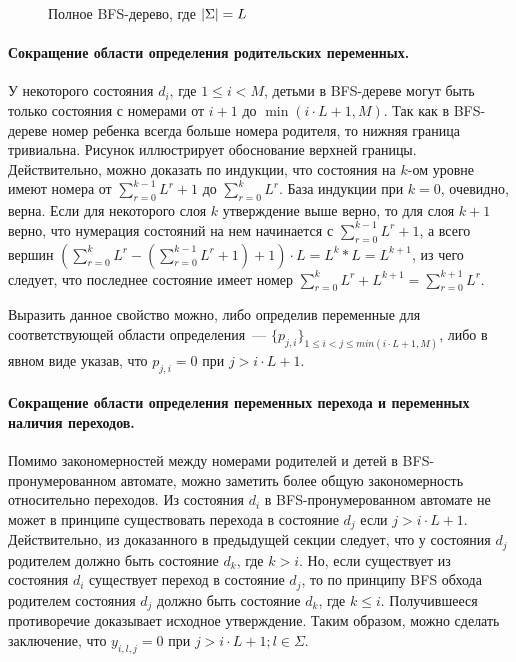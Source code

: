 \begin{figure}[ht]
  \centering
  \scalebox{0.625}{}
  \caption{Полное BFS-дерево, где $\lvert\Sigma\rvert=L$}
  \label{img:full-bfs}
\end{figure}

\paragraph{Сокращение области определения родительских переменных.}
У некоторого состояния $d_{i}$, где $1 \leq i < M$, детьми в BFS-дереве могут быть только состояния с номерами от $i + 1$ до $\min\left(i \cdot L + 1, M\right)$.
Так как в BFS-дереве номер ребенка всегда больше номера родителя, то нижняя граница тривиальна.
Рисунок  иллюстрирует обоснование верхней границы.
Действительно, можно доказать по индукции, что состояния на $k$-ом уровне имеют номера от $\sum_{r = 0}^{k - 1}L^{r} + 1$ до $\sum_{r = 0}^{k}L^{r}$.
База индукции при $k = 0$, очевидно, верна.
Если для некоторого слоя $k$ утверждение выше верно, то для слоя $k + 1$ верно, что нумерация состояний на нем начинается с $\sum_{r = 0}^{k - 1}L^{r} + 1$, а всего вершин $\left(\sum_{r = 0}^{k}L^{r} - \left(\sum_{r = 0}^{k - 1}L^{r} + 1\right) + 1\right) \cdot L = L^{k} * L = L^{k + 1}$, из чего следует, что последнее состояние имеет номер $\sum_{r = 0}^{k}L^{r} + L^{k + 1} = \sum_{r = 0}^{k + 1}L^{r}$.


Выразить данное свойство можно, либо определив переменные для соответствующей области определения~{---} $\{p_{j,i}\}_{1 \leq i < j \leq min(i \cdot L + 1, M)}$, либо в явном виде указав, что $p_{j,i} = 0$ при $j > i \cdot L + 1$.

\paragraph{Сокращение области определения переменных перехода и переменных наличия переходов.}
Помимо закономерностей между номерами родителей и детей в BFS-пронумерованном автомате, можно заметить более общую закономерность относительно переходов.
Из состояния $d_{i}$ в BFS-пронумерованном автомате не может в принципе существовать перехода в состояние $d_{j}$ если $j > i \cdot L + 1$.
Действительно, из доказанного в предыдущей секции следует, что у состояния $d_{j}$ родителем должно быть состояние $d_{k}$, где $k > i$.
Но, если существует из состояния $d_{i}$ существует переход в состояние $d_{j}$, то по принципу BFS обхода родителем состояния $d_{j}$ должно быть состояние $d_{k}$, где $k \leq i$.
Получившееся противоречие доказывает исходное утверждение.
Таким образом, можно сделать заключение, что $y_{i,l,j} = 0$ при $j > i \cdot L + 1; l \in \Sigma$.

